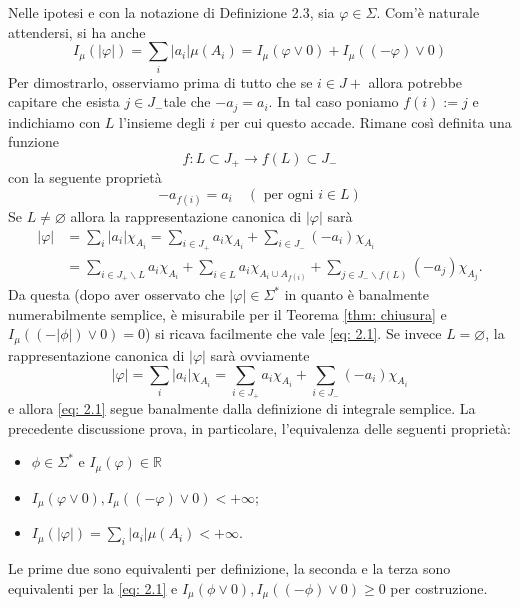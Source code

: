 \begin{oss}[$b$]   \label{oss: 2.4b}
    Nelle ipotesi e con la notazione di Definizione 2.3, sia $\varphi \in \Sigma$. Com'è naturale attendersi, si ha anche
    \begin{equation}
    I_{\mu}(|\varphi|)=\sum_{i}\left|a_{i}\right| \mu\left(A_{i}\right)=I_{\mu}(\varphi \vee 0)+I_{\mu}((-\varphi) \vee 0)\label{eq: 2.1}
    \end{equation}
    Per dimostrarlo, osserviamo prima di tutto che se $i \in J+$ allora potrebbe capitare che esista $j \in J_{-}$tale che $-a_{j}=a_{i}$. In tal caso poniamo $f(i):=j$ e indichiamo con $L$ l'insieme degli $i$ per cui questo accade. Rimane così definita una funzione
    \[
    f: L \subset J_{+} \rightarrow f(L) \subset J_{-}
    \]
    con la seguente proprietà
    \[
    -a_{f(i)}=a_{i} \quad(\text { per ogni } i \in L)
    \]
    Se $L \neq \varnothing$ allora la rappresentazione canonica di $|\varphi|$ sarà
    \[
    \begin{aligned}
    |\varphi| & =\sum_{i}\left|a_{i}\right| \chi_{A_{i}}=\sum_{i \in J_{+}} a_{i} \chi_{A_{i}}+\sum_{i \in J_{-}}\left(-a_{i}\right) \chi_{A_{i}} \\
    & =\sum_{i \in J_{+} \backslash L} a_{i} \chi_{A_{i}}+\sum_{i \in L} a_{i} \chi_{A_{i} \cup A_{f(i)}}+\sum_{j \in J_{-} \backslash f(L)}\left(-a_{j}\right) \chi_{A_{j}} .
    \end{aligned}
    \]
    Da questa (dopo aver osservato che $|\varphi| \in \Sigma^{*}$ in quanto è banalmente numerabilmente semplice, è misurabile per il Teorema \ref{thm: chiusura} e $I_\mu((-|\phi|)\vee 0) = 0$) si ricava facilmente che vale \eqref{eq: 2.1}. Se invece $L=\varnothing$, la rappresentazione canonica di $|\varphi|$ sarà ovviamente
    \[
    |\varphi|=\sum_{i}\left|a_{i}\right| \chi_{A_{i}}=\sum_{i \in J_{+}} a_{i} \chi_{A_{i}}+\sum_{i \in J_{-}}\left(-a_{i}\right) \chi_{A_{i}}
    \]
    e allora \eqref{eq: 2.1} segue banalmente dalla definizione di integrale semplice. La precedente discussione prova, in particolare, l'equivalenza delle seguenti proprietà:
    \begin{itemize}
      \item $\phi \in \Sigma^*$ e $I_{\mu}(\varphi) \in \mathbb{R}$
    
      \item $I_{\mu}(\varphi \vee 0), I_{\mu}((-\varphi) \vee 0)<+\infty$;
    
      \item $I_{\mu}(|\varphi|)=\sum_{i}\left|a_{i}\right| \mu\left(A_{i}\right)<+\infty$.
    \end{itemize}
    Le prime due sono equivalenti per definizione, la seconda e la terza sono equivalenti per la \eqref{eq: 2.1} e $I_\mu(\phi\vee 0), I_\mu((-\phi)\vee 0)\geq 0$ per costruzione.
\end{oss}

